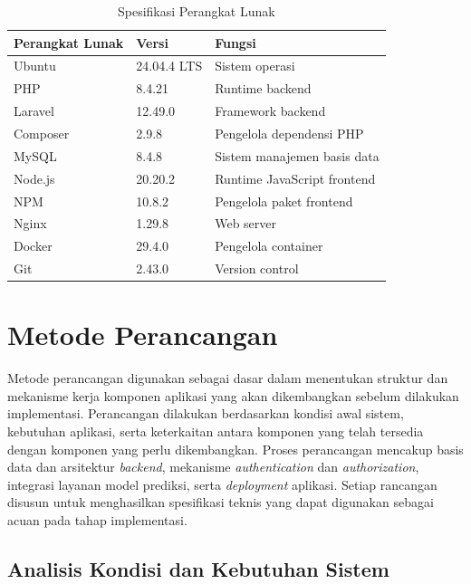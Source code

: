 \begin{table}[H]
    \centering
    \caption{Spesifikasi Perangkat Lunak}
    \label{tab:spesifikasi-software}
    \begin{tabular}{|l|l|l|}
        \hline
        \textbf{Perangkat Lunak} & \textbf{Versi} & \textbf{Fungsi} \\ \hline
        Ubuntu & 24.04.4 LTS & Sistem operasi \\ \hline
        PHP & 8.4.21 & Runtime backend \\ \hline
        Laravel & 12.49.0 & Framework backend \\ \hline
        Composer & 2.9.8 & Pengelola dependensi PHP \\ \hline
        MySQL & 8.4.8 & Sistem manajemen basis data \\ \hline
        Node.js & 20.20.2 & Runtime JavaScript frontend \\ \hline
        NPM & 10.8.2 & Pengelola paket frontend \\ \hline
        Nginx & 1.29.8 & Web server \\ \hline
        Docker & 29.4.0 & Pengelola container \\ \hline
        Git & 2.43.0 & Version control \\ \hline
    \end{tabular}
\end{table}

\section{Metode Perancangan}

Metode perancangan digunakan sebagai dasar dalam menentukan struktur dan mekanisme kerja komponen aplikasi yang akan dikembangkan sebelum dilakukan implementasi. Perancangan dilakukan berdasarkan kondisi awal sistem, kebutuhan aplikasi, serta keterkaitan antara komponen yang telah tersedia dengan komponen yang perlu dikembangkan. Proses perancangan mencakup basis data dan arsitektur \textit{backend}, mekanisme \textit{authentication} dan \textit{authorization}, integrasi layanan model prediksi, serta \textit{deployment} aplikasi. Setiap rancangan disusun untuk menghasilkan spesifikasi teknis yang dapat digunakan sebagai acuan pada tahap implementasi.

\subsection{Analisis Kondisi dan Kebutuhan Sistem}

